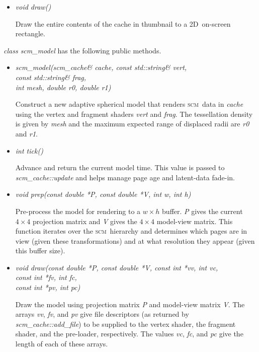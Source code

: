 \documentclass[oneside,10pt]{memoir}
\newcommand{\twod}    {2D}
\newcommand{\scm}     {\textsc{scm}}
\begin{document}
\begin{Spacing}{1.1}
\begin{itemize}
  \item\textit{void draw()}

    Draw the entire contents of the cache in thumbnail to a \twod\ on-screen rectangle.

\end{itemize}

\noindent\textit{class scm\_model} has the following public methods.

\begin{itemize}
  \item\textit{scm\_model(scm\_cache\& cache, const std::string\& vert,\\
      \phantom{scm\_model(scm\_cache\& cache,} const std::string\& frag,\\
      \phantom{scm\_model(scm\_cache\& cache,} int mesh, double r0, double r1)}

      Construct a new adaptive spherical model that renders \scm\ data in \textit{cache} using the vertex and fragment shaders \textit{vert} and \textit{frag}. The tessellation density is given by \textit{mesh} and the maximum expected range of displaced radii are \textit{r0} and \textit{r1}.

  \item\textit{int tick()}

    Advance and return the current model time. This value is passed to \textit{scm\_cache::update} and helps manage page age and latent-data fade-in.

  \item\textit{void prep(const double *P, const double *V, int w, int h)}

    Pre-process the model for rendering to a $w\times h$ buffer. \textit{P} gives the current $4\times 4$ projection matrix and \textit{V} gives the $4\times 4$ model-view matrix. This function iterates over the \scm\ hierarchy and determines which pages are in view (given these transformations) and at what resolution they appear (given this buffer size).

  \item\textit{void draw(const double *P, const double *V, const int *vv, int vc,\\
      \phantom{void draw(const double *P, const double *V,} const int *fv, int fc,\\
      \phantom{void draw(const double *P, const double *V,} const int *pv, int pc)}

    Draw the model using projection matrix \textit{P} and model-view matrix \textit{V}. The arrays \textit{vv}, \textit{fv}, and \textit{pv} give file descriptors (as returned by \textit{scm\_cache::add\_file}) to be supplied to the vertex shader, the fragment shader, and the pre-loader, respectively. The values \textit{vc}, \textit{fc}, and \textit{pc} give the length of each of these arrays.


\end{itemize}
\end{Spacing}
\end{document}
